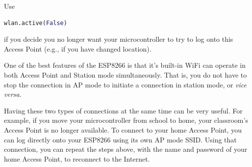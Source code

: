Use
\begin{lstlisting}[language=Python]
wlan.active(False)
\end{lstlisting}
if you decide you no longer want your microcontroller to try to log onto this Access Point (e.g., if you have changed location).

\begin{kaobox}[frametitle=WiFi special powers]
	One of the best features of the ESP8266 is that it's built-in WiFi can operate in both Access Point and Station mode simultaneously.
	That is, you do not have to stop the connection in AP mode to initiate a connection in station mode, or \textit{vice versa}.

	Having these two types of connections at the same time can be very useful.
	For example, if you move your microcontroller from school to home, your classroom's Access Point is no longer available.
	To connect to your home Access Point, you can log directly onto your ESP8266 using its own AP mode SSID.
	Using that connection, you can repeat the steps above, with the name and password of your home Access Point, to reconnect to the Internet.
\end{kaobox}



